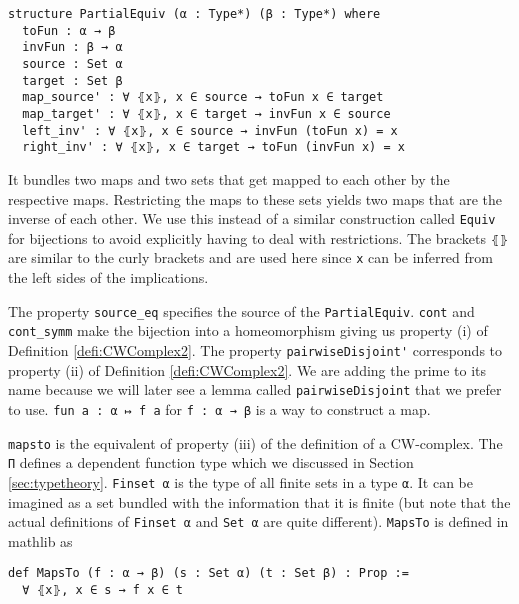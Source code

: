 \begin{lstlisting}
structure PartialEquiv (α : Type*) (β : Type*) where
  toFun : α → β
  invFun : β → α
  source : Set α
  target : Set β
  map_source' : ∀ ⦃x⦄, x ∈ source → toFun x ∈ target
  map_target' : ∀ ⦃x⦄, x ∈ target → invFun x ∈ source
  left_inv' : ∀ ⦃x⦄, x ∈ source → invFun (toFun x) = x
  right_inv' : ∀ ⦃x⦄, x ∈ target → toFun (invFun x) = x
\end{lstlisting}

It bundles two maps and two sets that get mapped to each other by the respective maps.
Restricting the maps to these sets yields two maps that are the inverse of each other.
We use this instead of a similar construction called \lstinline{Equiv} for bijections to avoid explicitly having to deal with restrictions.
The brackets \lstinline{⦃⦄} are similar to the curly brackets and are used here since \lstinline{x} can be inferred from the left sides of the implications.

The property \lstinline{source_eq} specifies the source of the \lstinline{PartialEquiv}.
\lstinline{cont} and \lstinline{cont_symm} make the bijection into a homeomorphism giving us property (i) of Definition \ref{defi:CWComplex2}.
The property \lstinline{pairwiseDisjoint'} corresponds to property (ii) of Definition \ref{defi:CWComplex2}.
We are adding the prime to its name because we will later see a lemma called \lstinline{pairwiseDisjoint} that we prefer to use.
\lstinline{fun a : α ↦ f a} for \lstinline{f : α → β} is a way to construct a map.

\lstinline{mapsto} is the equivalent of property (iii) of the definition of a CW-complex.
The \lstinline{Π} defines a dependent function type which we discussed in Section \ref{sec:typetheory}.
\lstinline{Finset α}
\href{https://github.com/leanprover-community/mathlib4/blob/ed125a4216d18273cb1b96d4c846d32b85d74faf/Mathlib/Data/Finset/Basic.lean#L133-L139}{\faExternalLink}
is the type of all finite sets in a type \lstinline{α}.
It can be imagined as a set bundled with the information that it is finite (but note that the actual definitions of \lstinline{Finset α} and \lstinline{Set α} are quite different).
\lstinline{MapsTo} is defined in mathlib as
\href{https://github.com/leanprover-community/mathlib4/blob/ed125a4216d18273cb1b96d4c846d32b85d74faf/Mathlib/Data/Set/Operations.lean#L231-L232}{\faExternalLink}

\begin{lstlisting}
def MapsTo (f : α → β) (s : Set α) (t : Set β) : Prop :=
  ∀ ⦃x⦄, x ∈ s → f x ∈ t
\end{lstlisting}

